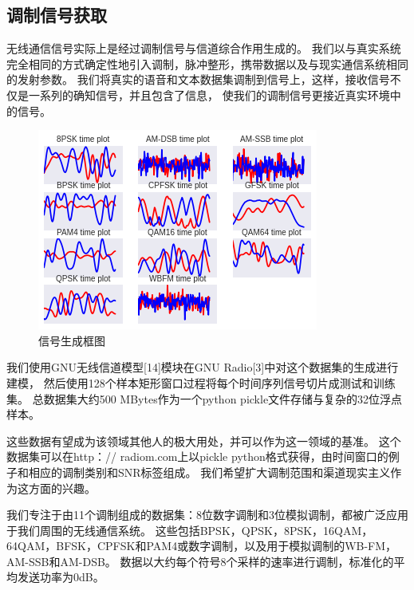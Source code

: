 \subsection{调制信号获取}

无线通信信号实际上是经过调制信号与信道综合作用生成的。
我们以与真实系统完全相同的方式确定性地引入调制，脉冲整形，携带数据以及与现实通信系统相同的发射参数。 
我们将真实的语音和文本数据集调制到信号上，这样，接收信号不仅是一系列的确知信号，并且包含了信息，
使我们的调制信号更接近真实环境中的信号。\par

\begin{figure}[!h]
	\centering
	\includegraphics[scale=0.9]{figures/chapter_3/signal_view_1}
	\caption{信号生成框图}\label{sec:fig_3_0}
\end{figure}

我们使用GNU无线信道模型[14]模块在GNU Radio[3]中对这个数据集的生成进行建模，
然后使用128个样本矩形窗口过程将每个时间序列信号切片成测试和训练集。 
总数据集大约500 MBytes作为一个python pickle文件存储与复杂的32位浮点样本。\par

这些数据有望成为该领域其他人的极大用处，并可以作为这一领域的基准。 这个数据集可以在http：// radiom.com上以pickle python格式获得，由时间窗口的例子和相应的调制类别和SNR标签组成。 我们希望扩大调制范围和渠道现实主义作为这方面的兴趣。\par

我们专注于由11个调制组成的数据集：8位数字调制和3位模拟调制，都被广泛应用于我们周围的无线通信系统。 这些包括BPSK，QPSK，8PSK，16QAM，64QAM，BFSK，CPFSK和PAM4或数字调制，以及用于模拟调制的WB-FM，AM-SSB和AM-DSB。 数据以大约每个符号8个采样的速率进行调制，标准化的平均发送功率为0dB。\par

